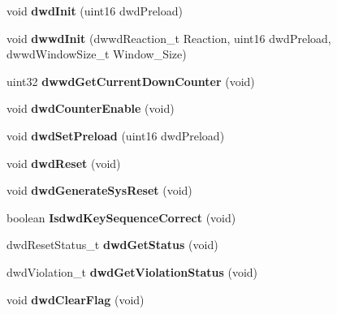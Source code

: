\begin{DoxyCompactItemize}
\item 
\mbox{\label{group__RTI_ga747a5cd06ff82d29a014e88fbe20aa93}} 
void {\bfseries dwd\+Init} (uint16 dwd\+Preload)
\item 
\mbox{\label{group__RTI_ga2d333bcf3001b04a60d6d19e336ccc1e}} 
void {\bfseries dwwd\+Init} (dwwd\+Reaction\+\_\+t Reaction, uint16 dwd\+Preload, dwwd\+Window\+Size\+\_\+t Window\+\_\+\+Size)
\item 
\mbox{\label{group__RTI_gafcec3271ff40c336ea4b7619d149d448}} 
uint32 {\bfseries dwwd\+Get\+Current\+Down\+Counter} (void)
\item 
\mbox{\label{group__RTI_ga2602a205a0268023fbb8984e82626c7e}} 
void {\bfseries dwd\+Counter\+Enable} (void)
\item 
\mbox{\label{group__RTI_ga1ebb089b241933fd6dd88747520f50f5}} 
void {\bfseries dwd\+Set\+Preload} (uint16 dwd\+Preload)
\item 
\mbox{\label{group__RTI_gaa7fafc67ed4059093a612cabc42026e5}} 
void {\bfseries dwd\+Reset} (void)
\item 
\mbox{\label{group__RTI_ga882dc32b3f7e02d7654254b7d6127467}} 
void {\bfseries dwd\+Generate\+Sys\+Reset} (void)
\item 
\mbox{\label{group__RTI_gacb458563eda6221fb18bd0187e8375fc}} 
boolean {\bfseries Isdwd\+Key\+Sequence\+Correct} (void)
\item 
\mbox{\label{group__RTI_ga870dd0c9c043e31be58aee3a2a6b25fb}} 
dwd\+Reset\+Status\+\_\+t {\bfseries dwd\+Get\+Status} (void)
\item 
\mbox{\label{group__RTI_gac91a05e949909b52d4b8fe401a4500f9}} 
dwd\+Violation\+\_\+t {\bfseries dwd\+Get\+Violation\+Status} (void)
\item 
\mbox{\label{group__RTI_ga788f96ec4de7cbbb2ad2e3794d6efb53}} 
void {\bfseries dwd\+Clear\+Flag} (void)
\item 
\mbox{\label{group__RTI_ga530b7108aae1d3f0ad319eb8a959d920}} 

\end{DoxyCompactItemize}
